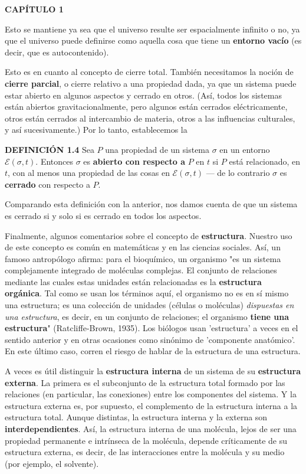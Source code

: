 \fancyhf{}
\fancyhead[l]{\thepage} 
\begin{center}
{\fontsize{16}{18}\selectfont \textbf{CAPÍTULO 1 }}
\end{center}
\vspace{0.5cm}

{\fontsize{13}{15}\selectfont
Esto se mantiene ya sea que el universo resulte ser espacialmente infinito o no, ya que el universo puede definirse como aquella cosa que tiene un \textbf{entorno vacío} (es decir, que es autocontenido).

Esto es en cuanto al concepto de cierre total. También necesitamos la noción de \textbf{cierre parcial}, o cierre relativo a una propiedad dada, ya que un sistema puede estar abierto en algunos aspectos y cerrado en otros. (Así, todos los sistemas están abiertos gravitacionalmente, pero algunos están cerrados eléctricamente, otros están cerrados al intercambio de materia, otros a las influencias culturales, y así sucesivamente.) Por lo tanto, establecemos la

\textbf{DEFINICIÓN 1.4} Sea $P$ una propiedad de un sistema $\sigma$ en un entorno $\mathcal{E}(\sigma, t)$. Entonces $\sigma$ es \textbf{abierto con respecto a} $P$ en $t$ si $P$ está relacionado, en $t$, con al menos una propiedad de las cosas en $\mathcal{E}(\sigma, t)$ — de lo contrario $\sigma$ es \textbf{cerrado} con respecto a $P$.

Comparando esta definición con la anterior, nos damos cuenta de que un sistema es cerrado si y solo si es cerrado en todos los aspectos.

Finalmente, algunos comentarios sobre el concepto de \textbf{estructura}. Nuestro uso de este concepto es común en matemáticas y en las ciencias sociales. Así, un famoso antropólogo afirma: para el bioquímico, un organismo "es un sistema complejamente integrado de moléculas complejas. El conjunto de relaciones mediante las cuales estas unidades están relacionadas es la \textbf{estructura orgánica}. Tal como se usan los términos aquí, el organismo no es en sí mismo una estructura; es una colección de unidades (células o moléculas) \textit{dispuestas en una estructura}, es decir, en un conjunto de relaciones; el organismo \textbf{tiene una estructura}" (Ratcliffe-Brown, 1935). Los biólogos usan 'estructura' a veces en el sentido anterior y en otras ocasiones como sinónimo de 'componente anatómico'. En este último caso, corren el riesgo de hablar de la estructura de una estructura.

A veces es útil distinguir la \textbf{estructura interna} de un sistema de su \textbf{estructura externa}. La primera es el subconjunto de la estructura total formado por las relaciones (en particular, las conexiones) entre los componentes del sistema. Y la estructura externa es, por supuesto, el complemento de la estructura interna a la estructura total. Aunque distintas, la estructura interna y la externa son \textbf{interdependientes}. Así, la estructura interna de una molécula, lejos de ser una propiedad permanente e intrínseca de la molécula, depende críticamente de su estructura externa, es decir, de las interacciones entre la molécula y su medio (por ejemplo, el solvente).

}
